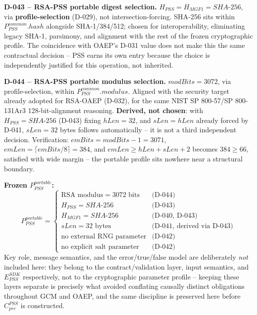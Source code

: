 \documentclass[11pt,a4paper]{article}
\begin{document}
\textbf{D-043 -- RSA-PSS portable digest selection.} $H_{PSS} = H_{MGF1} = SHA\text{-}256$, via \textbf{profile-selection} (D-029), not intersection-forcing. SHA-256 sits within $P_{PSS}^{common}.hash$ alongside SHA-1/384/512; chosen for interoperability, eliminating legacy SHA-1, parsimony, and alignment with the rest of the frozen cryptographic profile. The coincidence with OAEP's D-031 value does not make this the same contractual decision -- PSS earns its own entry because the choice is independently justified for this operation, not inherited.

\textbf{D-044 -- RSA-PSS portable modulus selection.} $modBits = 3072$, via profile-selection, within $P_{PSS}^{common}.modulus$. Aligned with the security target already adopted for RSA-OAEP (D-032), for the same NIST SP 800-57/SP 800-131Ar3 128-bit-alignment reasoning. \textbf{Derived, not chosen}: with $H_{PSS}=SHA\text{-}256$ (D-043) fixing $hLen=32$, and $sLen=hLen$ already forced by D-041, $sLen=32$ bytes follows automatically -- it is not a third independent decision. Verification: $emBits = modBits - 1 = 3071$, $emLen = \lceil emBits/8 \rceil = 384$, and $emLen \ge hLen+sLen+2$ becomes $384 \ge 66$, satisfied with wide margin -- the portable profile sits nowhere near a structural boundary.

\textbf{Frozen $P_{PSS}^{portable}$:}
\[
P_{PSS}^{portable} = \begin{cases}
\text{RSA modulus} = 3072 \text{ bits} & \text{(D-044)}\\
H_{PSS} = SHA\text{-}256 & \text{(D-043)}\\
H_{MGF1} = SHA\text{-}256 & \text{(D-040, D-043)}\\
sLen = 32 \text{ bytes} & \text{(D-041, derived via D-043)}\\
\text{no external RNG parameter} & \text{(D-042)}\\
\text{no explicit salt parameter} & \text{(D-042)}
\end{cases}
\]
Key role, message semantics, and the error/true/false model are deliberately \emph{not} included here: they belong to the contract/validation layer, input semantics, and $E_{PSS}^{SDK}$ respectively, not to the cryptographic parameter profile -- keeping these layers separate is precisely what avoided conflating causally distinct obligations throughout GCM and OAEP, and the same discipline is preserved here before $C_{pre}^{PSS}$ is constructed.
\end{document}
